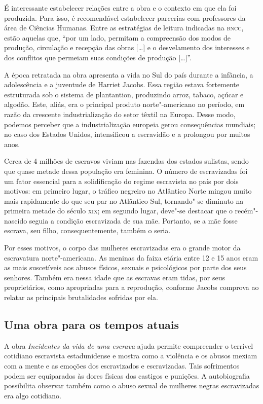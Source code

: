 \documentclass[12pt]{extarticle}
\begin{document}
É interessante estabelecer relações entre a obra e o contexto em que ela
foi produzida. Para isso, é recomendável estabelecer parcerias com
professores da área de Ciências Humanas. Entre as estratégias de leitura
indicadas na \textsc{bncc}, estão aquelas que, ``por um lado, permitam a
compreensão dos modos de produção, circulação e recepção das obras
{[}\ldots{}{]} e o desvelamento dos interesses e dos conflitos que permeiam
suas condições de produção {[}\ldots{}{]}''.

A época retratada na obra apresenta a vida no Sul do país durante a
infância, a adolescência e a juventude de Harriet Jacobs. Essa região
estava fortemente estruturada sob o sistema de plantantion, produzindo
arroz, tabaco, açúcar e algodão. Este, aliás, era o principal produto
norte"-americano no período, em razão da crescente industrialização do
setor têxtil na Europa. Desse modo, podemos perceber que a
industrialização europeia gerou consequências mundiais; no caso dos
Estados Unidos, intensificou a escravidão e a prolongou por muitos anos.

Cerca de 4 milhões de escravos viviam nas fazendas dos estados sulistas,
sendo que quase metade dessa população era feminina. O número de
escravizadas foi um fator essencial para a solidificação do regime
escravista no país por dois motivos: em primeiro lugar, o tráfico
negreiro no Atlântico Norte mingou muito mais rapidamente do que seu par
no Atlântico Sul, tornando"-se diminuto na primeira metade do século \textsc{xix};
em segundo lugar, deve"-se destacar que o recém"-nascido seguia a condição
escravizada de sua mãe. Portanto, se a mãe fosse escrava, seu filho,
consequentemente, também o seria.

Por esses motivos, o corpo das mulheres escravizadas era o grande motor
da escravatura norte"-americana. As meninas da faixa etária entre 12 e 15
anos eram as mais suscetíveis aos abusos físicos, sexuais e psicológicos
por parte dos seus senhores. Também era nessa idade que as escravas eram
tidas, por seus proprietários, como apropriadas para a reprodução,
conforme Jacobs comprova ao relatar as principais brutalidades sofridas
por ela.

\subsection{Uma obra para os tempos atuais}

A obra \emph{Incidentes da vida de uma escrava} ajuda permite
compreender o terrível cotidiano escravista estadunidense e mostra como
a violência e os abusos mexiam com a mente e as emoções dos escravizados
e escravizadas. Tais sofrimentos podem ser equiparados às dores físicas
dos castigos e punições. A autobiografia possibilita observar também
como o abuso sexual de mulheres negras escravizadas era algo cotidiano.
\end{document}
